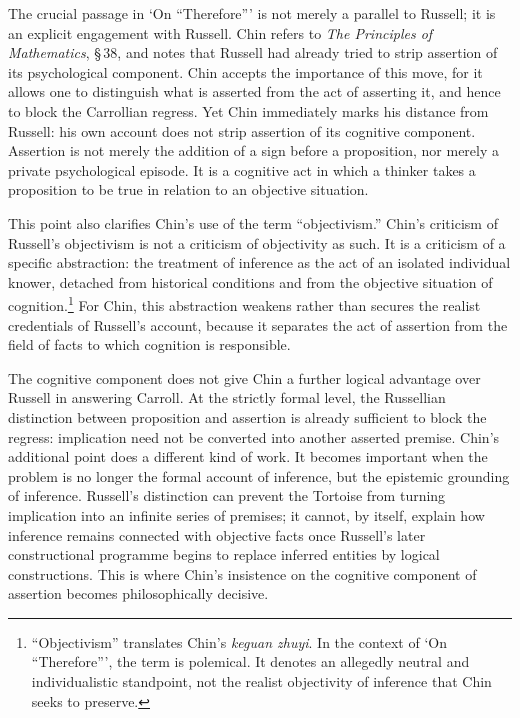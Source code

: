 \documentclass{birkjour}
\begin{document}
The crucial passage in `On ``Therefore''' is not merely a parallel to Russell; it is an explicit engagement with Russell. Chin refers to \textit{The Principles of Mathematics}, \S\,38, and notes that Russell had already tried to strip assertion of its psychological component. Chin accepts the importance of this move, for it allows one to distinguish what is asserted from the act of asserting it, and hence to block the Carrollian regress. Yet Chin immediately marks his distance from Russell: his own account does not strip assertion of its cognitive component. Assertion is not merely the addition of a sign before a proposition, nor merely a private psychological episode. It is a cognitive act in which a thinker takes a proposition to be true in relation to an objective situation.

This point also clarifies Chin's use of the term ``objectivism.'' Chin's criticism of Russell's objectivism is not a criticism of objectivity as such. It is a criticism of a specific abstraction: the treatment of inference as the act of an isolated individual knower, detached from historical conditions and from the objective situation of cognition.\footnote{``Objectivism'' translates Chin's \emph{keguan zhuyi}. In the context of `On ``Therefore''', the term is polemical. It denotes an allegedly neutral and individualistic standpoint, not the realist objectivity of inference that Chin seeks to preserve.} For Chin, this abstraction weakens rather than secures the realist credentials of Russell's account, because it separates the act of assertion from the field of facts to which cognition is responsible.

The cognitive component does not give Chin a further logical advantage over Russell in answering Carroll. At the strictly formal level, the Russellian distinction between proposition and assertion is already sufficient to block the regress: implication need not be converted into another asserted premise. Chin's additional point does a different kind of work. It becomes important when the problem is no longer the formal account of inference, but the epistemic grounding of inference. Russell's distinction can prevent the Tortoise from turning implication into an infinite series of premises; it cannot, by itself, explain how inference remains connected with objective facts once Russell's later constructional programme begins to replace inferred entities by logical constructions. This is where Chin's insistence on the cognitive component of assertion becomes philosophically decisive.
\end{document}
